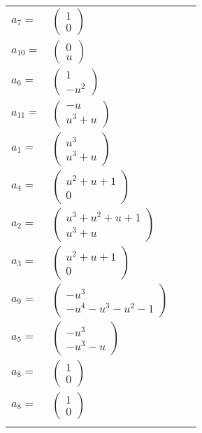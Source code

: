 \documentclass[1p]{elsarticle_modified}
\theoremstyle{definition}
\begin{document}
\begin{tabular}{m{7pt} m{180pt} m{7pt} m{180pt} }
\flushright $a_{7}=$&$\begin{pmatrix}1\\0\end{pmatrix}$ \\
\flushright $a_{10}=$&$\begin{pmatrix}0\\u\end{pmatrix}$ \\
\flushright $a_{6}=$&$\begin{pmatrix}1\\- u^2\end{pmatrix}$ \\
\flushright $a_{11}=$&$\begin{pmatrix}- u\\u^3+u\end{pmatrix}$ \\
\flushright $a_{1}=$&$\begin{pmatrix}u^3\\u^3+u\end{pmatrix}$ \\
\flushright $a_{4}=$&$\begin{pmatrix}u^2+u+1\\0\end{pmatrix}$ \\
\flushright $a_{2}=$&$\begin{pmatrix}u^3+u^2+u+1\\u^3+u\end{pmatrix}$ \\
\flushright $a_{3}=$&$\begin{pmatrix}u^2+u+1\\0\end{pmatrix}$ \\
\flushright $a_{9}=$&$\begin{pmatrix}- u^3\\- u^4- u^3- u^2-1\end{pmatrix}$ \\
\flushright $a_{5}=$&$\begin{pmatrix}- u^3\\- u^3- u\end{pmatrix}$ \\
\flushright $a_{8}=$&$\begin{pmatrix}1\\0\end{pmatrix}$\\ \flushright $a_{8}=$&$\begin{pmatrix}1\\0\end{pmatrix}$\\&\end{tabular}
\end{document}
